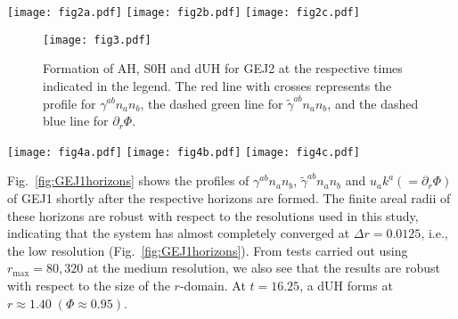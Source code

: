 \documentclass[aps,preprintnumbers,twocolumn,showpacs]{revtex4-1}
\begin{document}
\begin{figure*}
  \texttt{[image: fig2a.pdf]}
\endminipage\hfill
{}
  \texttt{[image: fig2b.pdf]}
\endminipage\hfill
{}%
  \texttt{[image: fig2c.pdf]}
\endminipage
\caption{Formation of (a) AH, (b) S0H, and (c) dUH for  GEJ1  at the respective times indicated in each panel. The almost complete overlap of the curves obtained from simulations with low, medium and high resolutions show that the system has almost completely converged at the low resolution of this study. \label{fig:GEJ1horizons}}
\end{figure*}


\begin{figure}
\texttt{[image: fig3.pdf]}%
\caption{Formation of  AH, S0H and dUH   for  GEJ2  at the respective times indicated in the legend. The red line with crosses represents the profile for $\gamma^{ab} n_a n_b$, the dashed green line for $\tilde\gamma^{ab} n_a n_b$, and the dashed blue line for $\partial_r\Phi$.  
 \label{fig:GEJ2horizons}}
\end{figure}

\begin{figure*}
  \texttt{[image: fig4a.pdf]}
\endminipage\hfill
{}
  \texttt{[image: fig4b.pdf]}
\endminipage\hfill
{}%
  \texttt{[image: fig4c.pdf]}
\endminipage
\caption{Locations of (a) AH (black dot in inset), (b) S0H (black triangle in inset), and (c) dUHs (black squares in inset)  for  NC. The red line in each plot indicates the profiles shortly after the respective horizons form.}\label{fig:NChorizons}
\end{figure*}


 


Fig.~\ref{fig:GEJ1horizons} shows the profiles of $\gamma^{ab}n_a n_b$, $\tilde\gamma^{ab} n_a n_b$ and $u_a k^a (=\partial_r\Phi)$ of  GEJ1 shortly after the respective horizons  are  formed. The finite areal radii of these horizons are robust with respect to the resolutions used in this study, indicating that the system has almost completely converged at $\Delta r=0.0125$, i.e., the low resolution (Fig.~\ref{fig:GEJ1horizons}). From tests carried out using $r_{\text{max}}=80,320$ at the medium resolution, we also see that the results are robust with respect to the size of the $r$-domain. At $t=16.25$, a dUH forms at $r\approx 1.40 \; (\Phi\approx 0.95)$.  
\end{document}
